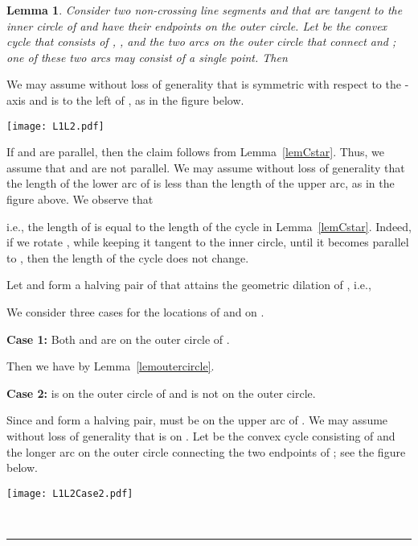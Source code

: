 \documentclass[12pt]{article}
\newtheorem{lemma}{Lemma}
\newcommand{\qed}{\rule{0.5em}{1.5ex}}
\newcommand{\fqed}{{\hfill~\qed}}
\newenvironment{proof}{{\noindent \bf Proof.}}
                      {{\hfill \fqed} \vspace{1em}}
\begin{document}
\begin{lemma}   \label{lemtwo}  
Consider two non-crossing line segments  and  that are tangent 
to the inner circle of  and have their endpoints on the outer 
circle. Let  be the convex cycle that consists of , , 
and the two arcs on the outer circle that connect  and ; 
one of these two arcs may consist of a single point. Then 
  
\end{lemma} 
\begin{proof}  
We may assume without loss of generality that  is symmetric with 
respect to the -axis and  is to the left of , as in the 
figure below. 

\begin{center}
   \texttt{[image: L1L2.pdf]}
\end{center}

If  and  are parallel, then the claim follows from 
Lemma~\ref{lemCstar}. Thus, we assume that  and  are not 
parallel. We may assume without loss of generality that the length of 
the lower arc of  is less than the length of the upper arc, as 
in the figure above. We observe that 
 
i.e., the length of  is equal to the length of the cycle  in 
Lemma~\ref{lemCstar}. Indeed, if we rotate , while keeping it 
tangent to the inner circle, until it becomes parallel to , then 
the length of the cycle does not change. 

Let  and  form a halving pair of  that attains the geometric 
dilation of , i.e., 
  
We consider three cases for the locations of  and  on . 

\vspace{0.5em} 

\noindent 
{\bf Case 1:} Both  and  are on the outer circle of . 

Then we have  by Lemma~\ref{lemoutercircle}. 

\vspace{0.5em} 

\noindent 
{\bf Case 2:}  is on the outer circle of  and  is not 
on the outer circle. 

Since  and  form a halving pair,  must be on the upper arc of 
. We may assume without loss of generality that  is on .  
Let  be the convex cycle consisting of  and the longer arc 
on the outer circle connecting the two endpoints of ; see the 
figure below.  
\begin{center}
   \texttt{[image: L1L2Case2.pdf]}
\end{center}


\end{proof}
\end{document}
